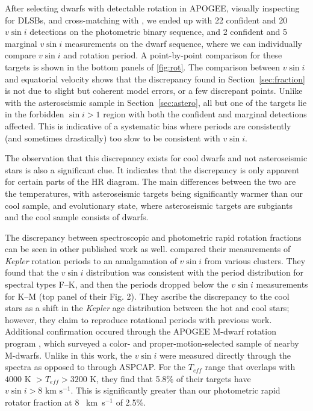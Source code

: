\documentclass[manuscript]{aastex6}
\newcommand{\vsini}{\ensuremath{v \sin i}}
\newcommand{\Kepler}{\mbox{\textit{Kepler}}}
\newcommand{\Teff}{\ensuremath{T_{eff}}}
\newcommand{\kms}{\textrm{~km~s}\ensuremath{^{-1}}}
\begin{document}
After selecting dwarfs with detectable rotation in APOGEE,
visually inspecting for DLSBs, and cross-matching with \citet{McQuillan14}, we 
ended up with 22 confident and 20 \vsini{} detections on the photometric binary
sequence, and 2 confident and 5 marginal \vsini{} measurements on the dwarf
sequence, where we can individually compare \vsini{} and rotation period. A 
point-by-point
comparison for these targets is shown in the bottom panels of
\cref{fig:rot}. The comparison between \vsini{} and equatorial velocity shows
that the discrepancy found in Section~\ref{sec:fraction} is not due to slight
but coherent model errors, or a few discrepant points. Unlike with the
asteroseismic sample in Section~\ref{sec:astero}, all but one of the targets
lie in the forbidden \(\sin i > 1\) region with both the confident and
marginal detections affected. This is indicative of a systematic
bias where periods are consistently (and sometimes drastically) too slow to be
consistent with \vsini{}.

The observation that this discrepancy exists for cool dwarfs and not
asteroseismic stars is also a significant clue. It indicates that the
discrepancy is only apparent for certain parts of the HR diagram. The main
differences between the two are the temperatures, with asteroseismic targets
being significantly warmer than our cool sample, and evolutionary state, where
asteroseismic targets are subgiants and the cool sample consists of dwarfs.

The discrepancy between spectroscopic and 
photometric rapid rotation fractions can be seen in other published work as well. 
\citet{Nielsen13} compared their measurements of \Kepler{} rotation periods to
an amalgamation of \vsini{} from various clusters. They found that the
\vsini{} distribution was consistent with the period distribution for spectral
types F--K, and then the periods dropped below the \vsini{} measurements for
K--M (top panel of their Fig. 2). They ascribe the discrepancy to the cool
stars as a shift in the \Kepler{} age distribution between the hot and cool
stars; however, they claim to reproduce rotational periods with previous work. 
Additional confirmation occured through the APOGEE M-dwarf rotation
program \citep{Gilhool18}, which surveyed a color- and proper-motion-selected 
sample of nearby M-dwarfs. Unlike in this work, the \vsini{} were measured 
directly through the spectra as opposed to through ASPCAP\@. For the \Teff{} range that
overlaps with \citet{McQuillan14} \(4000 \textrm{ K } > \Teff > 3200\) K, they 
find that 5.8\% of their targets have \(\vsini > 8 \kms\). This is 
significantly greater than our photometric rapid rotator fraction at 8 \kms{} 
of 2.5\%. 
\end{document}
